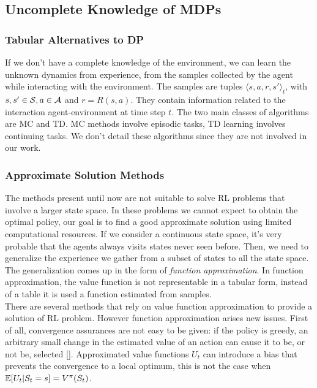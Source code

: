\subsection{Uncomplete Knowledge of \ac{MDPs}}

\subsubsection{Tabular Alternatives to \ac{DP}}\label{subsec:alt}
If we don't have a complete knowledge of the environment, we can learn the unknown dynamics from experience, \ie from the samples collected by the agent while interacting with the environment. The samples are tuples $\langle s,a,r,s' \rangle_t$, with $s, s' \in \mathcal{S}, a \in \mathcal{A}$ and $r = R(s,a)$. They contain information related to the interaction agent-environment at time step $t$. The two main classes of algorithms are \acf{MC} and \acf{TD}. \ac{MC} methods involve episodic tasks, \ac{TD} learning involves continuing tasks. We don't detail these algorithms since they are not involved in our work.

\subsubsection{Approximate Solution Methods}
The methods present until now are not suitable to solve \ac{RL} problems that involve a larger state space. In these problems we cannot expect to obtain the optimal policy, our goal is to find a good approximate solution using limited computational resources. If we consider a continuous state space, it's very probable that the agents always visits states never seen before. Then, we need to generalize the experience we gather from a subset of states to all the state space. The generalization comes up in the form of \emph{function approximation}. In function approximation, the value function is not representable in a tabular form, instead of a table it is used a function estimated from samples.\\
\newline
There are several methods that rely on value function approximation to provide a solution of \ac{RL} problem. However function approximation arises new issues. First of all, convergence assurances are not easy to be given: if the policy is greedy, an arbitrary small change in the estimated value of an action can cause it to be, or not be, selected [\citet{Sutton1999PolicyGM}]. Approximated value functions $U_t$ can introduce a bias that prevents the convergence to a local optimum, this is not the case when $\operatorname*{\mathbb{E}}[U_t|S_t = s] = V^{\pi}(S_t)$. 

